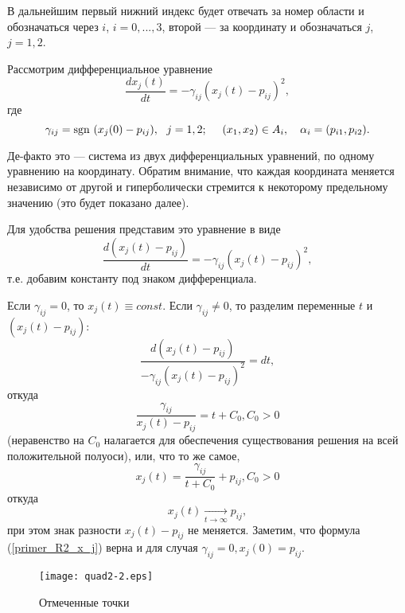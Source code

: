 В дальнейшим первый нижний индекс будет отвечать за номер области и обозначаться через $i$,
$i=0, ..., 3$, второй --- за координату и обозначаться $j$, $j=1, 2$.

Рассмотрим дифференциальное уравнение
\begin{equation}\label{difur_primer_R2}
	\frac{dx_j(t)}{dt} = -\gamma_{ij}(x_j(t)-p_{ij})^2,
\end{equation}
где
$$
	\gamma_{ij} = \mathrm{sgn}~(x_j(0)-p_{ij}),~~j=1,2;~~~~
	(x_1, x_2) \in A_i, ~~~ \alpha_i = (p_{i1},p_{i2}).
$$

Де-факто это --- система из двух дифференциальных уравнений, по одному уравнению на координату.
Обратим внимание, что каждая координата меняется независимо от другой и гиперболически стремится
к некоторому предельному значению (это будет показано далее).

Для удобства решения представим это уравнение в виде
\begin{equation*}
	\frac{d(x_j(t) - p_{ij})}{dt} = -\gamma_{ij}(x_j(t)-p_{ij})^2,
\end{equation*}
т.е. добавим константу под знаком дифференциала.

Если $\gamma_{ij} = 0$, то $x_j(t) \equiv const$.
Если $\gamma_{ij} \neq 0$, то разделим переменные $t$ и $(x_j(t) - p_{ij})$:
\begin{equation*}
	\frac{d(x_j(t) - p_{ij})}{-\gamma_{ij}(x_j(t)-p_{ij})^2} = dt ,
\end{equation*}
откуда
\begin{equation*}
	\frac{\gamma_{ij}}{x_j(t)-p_{ij}} = t+C_0, C_0 > 0
\end{equation*}
(неравенство на $C_0$ налагается для обеспечения существования решения на всей положительной полуоси),
или, что то же самое,
\begin{equation}\label{primer_R2_x_j}
	x_j(t) = \frac{\gamma_{ij}}{t+C_0}+p_{ij}, C_0 > 0
\end{equation}
откуда
\begin{equation*}
	x_j(t) \xrightarrow[t\to \infty ]{}{p_{ij}},
\end{equation*}
при этом знак разности $x_j(t) - p_{ij}$ не меняется.
Заметим, что формула (\ref{primer_R2_x_j}) верна и для случая $\gamma_{ij}=0, x_j(0)=p_{ij}$.

\begin{wrapfigure}[18]{r}{7.5cm}
	\texttt{[image: quad2-2.eps]}
	\caption{Отмеченные точки}
	\label{fig:somelabel2}
\end{wrapfigure}

